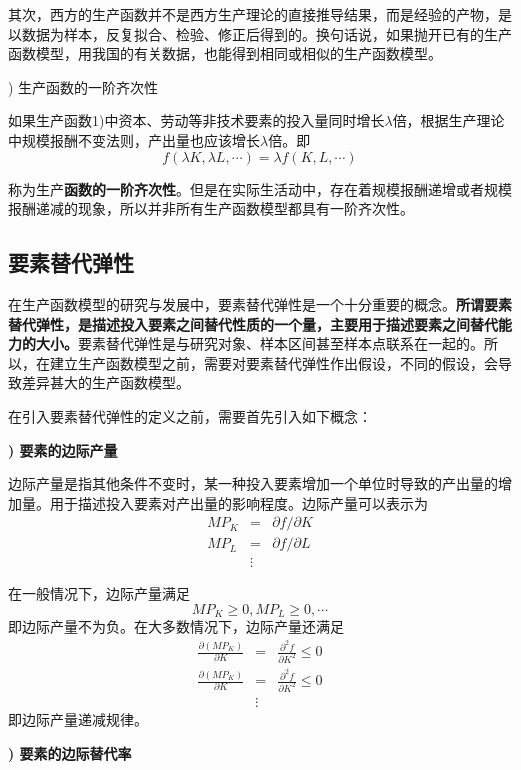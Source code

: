其次，西方的生产函数并不是西方生产理论的直接推导结果，而是经验的产物，是以数据为样本，反复拟合、检验、修正后得到的。换句话说，如果抛开已有的生产函数模型，用我国的有关数据，也能得到相同或相似的生产函数模型。
		
) 生产函数的一阶齐次性
			
如果生产函数1)中资本、劳动等非技术要素的投入量同时增长$ \lambda $倍，根据生产理论中规模报酬不变法则，产出量也应该增长$ \lambda $倍。即
$$ f(\lambda K, \lambda L, \cdots)=\lambda f(K, L, \cdots) $$

称为生产\textbf{函数的一阶齐次性}。但是在实际生活动中，存在着规模报酬递增或者规模报酬递减的现象，所以并非所有生产函数模型都具有一阶齐次性。

\subsection{要素替代弹性}

在生产函数模型的研究与发展中，要素替代弹性是一个十分重要的概念。\textbf{所谓要素替代弹性，是描述投入要素之间替代性质的一个量，主要用于描述要素之间替代能力的大小。}要素替代弹性是与研究对象、样本区间甚至样本点联系在一起的。所以，在建立生产函数模型之前，需要对要素替代弹性作出假设，不同的假设，会导致差异甚大的生产函数模型。
		
在引入要素替代弹性的定义之前，需要首先引入如下概念：
		
{\bf {}) 要素的边际产量}
			
	边际产量是指其他条件不变时，某一种投入要素增加一个单位时导致的产出量的增加量。用于描述投入要素对产出量的影响程度。边际产量可以表示为
	\begin{eqnarray*}
		M P_{K} & = & \partial f / \partial K \\
		M P_{L} & = & \partial f / \partial L \\
				& \vdots &				
	\end{eqnarray*}

	在一般情况下，边际产量满足
	$$ M P_{K} \geq 0, M P_{L} \geq 0, \cdots $$
	即边际产量不为负。在大多数情况下，边际产量还满足
	\begin{eqnarray*}
		\frac{\partial\left(M P_{K}\right)}{\partial K} & = & \frac{\partial^{2} f}{\partial K^{2}} \leq 0 \\
			\frac{\partial\left(M P_{K}\right)}{\partial K} & = & \frac{\partial^{2} f}{\partial K^{2}} \leq 0 \\
		& \vdots &
	\end{eqnarray*}
	即边际产量递减规律。
		
{\bf {}) 要素的边际替代率}
			
